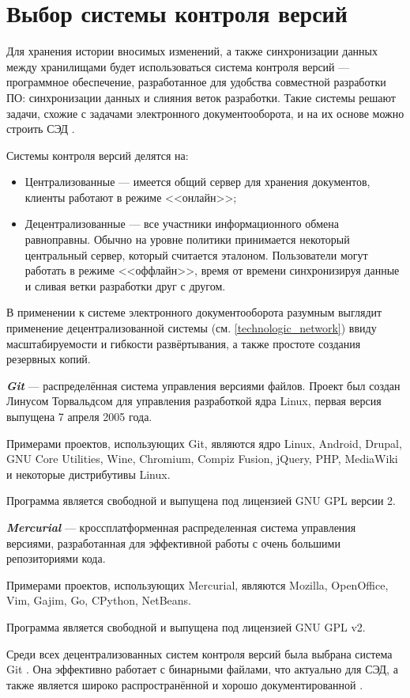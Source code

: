 \section{Выбор системы контроля версий} \label{technologic_cvs}

Для хранения истории вносимых изменений, а также синхронизации данных между хранилищами будет использоваться система контроля версий --- программное обеспечение, разработанное для удобства совместной разработки ПО: синхронизации данных и слияния веток разработки. Такие системы решают задачи, схожие с задачами  электронного документооборота, и на их основе можно строить СЭД \cite{my_conference_2013}.

\vspace{\baselineskip}
Системы контроля версий делятся на:
\begin{itemize}
		\item Централизованные --- имеется общий сервер для хранения документов, клиенты работают в режиме <<онлайн>>;
		\item Децентрализованные --- все участники информационного обмена равноправны. Обычно на уровне политики принимается некоторый центральный сервер, который считается эталоном. Пользователи могут работать в режиме <<оффлайн>>, время от времени синхронизируя данные и сливая ветки разработки друг с другом.
	\end{itemize}

\vspace{\baselineskip}
В применении к системе электронного документооборота разумным выглядит применение децентрализованной системы (см. \ref{technologic_network}) ввиду масштабируемости и гибкости развёртывания, а также простоте создания резервных копий. 

\vspace{\baselineskip}
\textbf{\textit{Git}} --- распределённая система управления версиями файлов. Проект был создан Линусом Торвальдсом для управления разработкой ядра Linux, первая версия выпущена 7 апреля 2005 года.

Примерами проектов, использующих Git, являются ядро Linux, Android, Drupal, GNU Core Utilities, Wine, Chromium, Compiz Fusion, jQuery, PHP, MediaWiki и некоторые дистрибутивы Linux.

Программа является свободной и выпущена под лицензией GNU GPL версии 2.

\vspace{\baselineskip}
\textbf{\textit{Mercurial}} --- кроссплатформенная распределенная система управления версиями, разработанная для эффективной работы с очень большими репозиториями кода. 

Примерами проектов, использующих Mercurial, являются Mozilla, OpenOffice, Vim, Gajim, Go, CPython, NetBeans.

Программа является свободной и выпущена под лицензией GNU GPL v2.

\vspace{\baselineskip}
Среди всех децентрализованных систем контроля версий была выбрана система Git . Она эффективно работает с бинарными файлами, что актуально для СЭД, а также является широко распространённой и хорошо документированной \cite{my_conference_2013}.